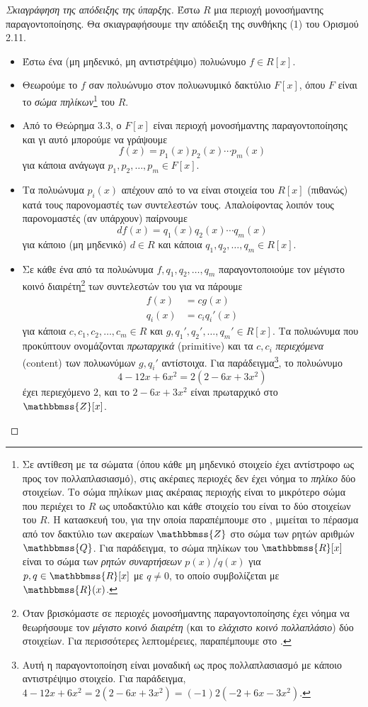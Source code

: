 \documentclass[12pt,a4paper,reqno]{amsart}
\theoremstyle{definition}
\theoremstyle{remark}
\numberwithin{theorem}{section}
\numberwithin{exercise}{section}
\numberwithin{equation}{section}
\newcommand{\ZZ}{\mathbbmss{Z}}
\newcommand{\QQ}{\mathbbmss{Q}}
\newcommand{\RR}{\mathbbmss{R}}
\begin{document}
\begin{proof}[Σκιαγράφηση της απόδειξης της ύπαρξης]
Έστω $R$ μια περιοχή μονοσήμαντης παραγοντοποί\-ησης. Θα σκιαγραφήσουμε την απόδειξη της συνθήκης (1) του Ορισμού 2.11.
\begin{itemize}
    \item Έστω ένα (μη μηδενικό, μη αντιστρέψιμο) πολυώνυμο $f \in R[x]$.
    \item Θεωρούμε το $f$ σαν πολυώνυμο στον  πολυωνυμικό δακτύλιο $F[x]$, όπου $F$ είναι το \emph{σώμα πηλίκων}\footnote{Σε αντίθεση με τα σώματα (όπου κάθε μη μηδενικό στοιχείο έχει αντίστροφο ως προς τον πολλαπλασιασμό), στις ακέραιες περιοχές δεν έχει νόημα το \emph{πηλίκο} δύο στοιχείων. Το σώμα πηλίκων μιας ακέραιας περιοχής είναι το μικρότερο σώμα που περιέχει το $R$ ως υποδακτύλιο και κάθε στοιχείο του είναι το  δύο στοιχείων του $R$. Η κατασκευή του, για την οποία παραπέμπουμε στο \cite[Ενότητα~2.7]{VDEMT13}, μιμείται το πέρασμα από τον δακτύλιο των ακεραίων $\ZZ$ στο σώμα των ρητών αριθμών $\QQ$. Για παράδειγμα, το σώμα πηλίκων του $\RR[x]$ είναι το σώμα των \emph{ρητών συναρτήσεων} $p(x)/q(x)$ για $p, q \in \RR[x]$ με $q \neq 0$, το οποίο συμβολίζεται με $\RR(x)$.} του $R$.
    
    \item Από το Θεώρημα 3.3, ο $F[x]$ είναι περιοχή μονοσήμαντης παραγοντοποίησης και γι αυτό μπορούμε να γράψουμε
    \[
    f(x) = p_1(x) p_2(x) \cdots p_m(x)
    \]
    για κάποια ανάγωγα $p_1, p_2, \dots, p_m \in F[x]$. 

    \item Τα πολυώνυμα $p_i(x)$ απέχουν από το να είναι στοιχεία του $R[x]$ (πιθανώς) κατά τους παρονομαστές των συντελεστών τους. Απαλοίφοντας λοιπόν τους παρονομαστές (αν υπάρχουν) παίρνουμε 
    \[
    df(x) = q_1(x)q_2(x)\cdots q_m(x)
    \]
    για κάποιο (μη μηδενικό) $d \in R$ και κάποια $q_1, q_2, \dots, q_m \in R[x]$.

    \item Σε κάθε ένα από τα πολυώνυμα $f, q_1, q_2, \dots, q_m$ παραγοντοποιούμε τον μέγιστο κοινό διαιρέτη\footnote{Όταν βρισκόμαστε σε περιοχές μονοσήμαντης παραγοντοποίησης έχει νόημα να θεωρήσουμε τον \emph{μέγιστο κοινό διαιρέτη} (και το \emph{ελάχιστο κοινό πολλαπλάσιο}) δύο στοι\-χείων. Για περισσότερες λεπτομέρειες, παραπέμπουμε στο \cite[Ενότητα~11.4.2]{Mpe15}.} των συντελεστών του για να πάρουμε 
    \begin{align*}
        f(x) &= cg(x) \\
        q_i(x) &= c_i q_i'(x)
    \end{align*}
    για κάποια $c, c_1, c_2, \dots, c_m \in R$ και $g, q_1', q_2', \dots, q_m' \in R[x]$. Τα πολυώνυμα που προκύπτουν ονομάζονται \emph{πρωταρχικά} (primitive) και τα $c, c_i$ \emph{περιεχόμενα} (content) των πολυωνύμων $g, q_i'$ αντίστοιχα. Για παράδειγμα\footnote{Αυτή η παραγοντοποίηση είναι μοναδική ως προς πολλαπλασιασμό με κάποιο αντιστρέψιμο στοιχείο. Για παράδειγμα, $4 - 12x + 6x^2 = 2(2 - 6x + 3x^2) = (-1)2(-2 + 6x - 3x^2)$.}, το πολυώνυμο
    \[
    4 - 12x + 6x^2 = 2(2 - 6x + 3x^2)
    \]
    έχει περιεχόμενο $2$, και το $2 - 6x + 3x^2$ είναι πρωταρχικό στο $\ZZ[x]$.


\end{itemize}
\end{proof}
\end{document}
